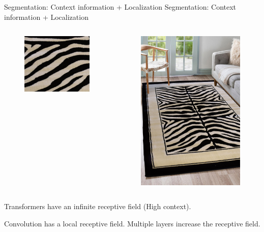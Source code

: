 \documentclass[aspectratio=169]{beamer}
\begin{document}
\begin{frame}{Segmentation: Context information + Localization}
  Segmentation: Context information + Localization 
\begin{columns}
        \begin{figure}
        \centering \includegraphics[width=0.6\linewidth]{Figures/zebra1.jpg}
        \end{figure}  
    
    
            \begin{figure}
            \centering \includegraphics[width=0.4\linewidth]{Figures/zebra.jpg}
            \end{figure}
    
\end{columns}

Transformers have an infinite receptive field (High context).

Convolution has a local receptive field. Multiple layers increase the receptive field.   
\end{frame}
\end{document}
